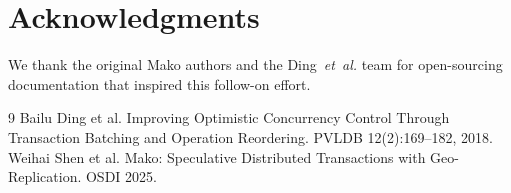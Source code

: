 \documentclass[letterpaper,twocolumn,10pt]{article}
\newcommand{\sysname}{Mako\xspace}
\begin{document}
\section*{Acknowledgments}
We thank the original \sysname authors and the Ding~\emph{et~al.} team for open-sourcing documentation that inspired this follow-on effort.


\begin{thebibliography}{9}
Bailu Ding et al. Improving Optimistic Concurrency Control Through Transaction Batching and Operation Reordering. PVLDB 12(2):169--182, 2018.
Weihai Shen et al. Mako: Speculative Distributed Transactions with Geo-Replication. OSDI 2025.
\end{thebibliography}
\end{document}
